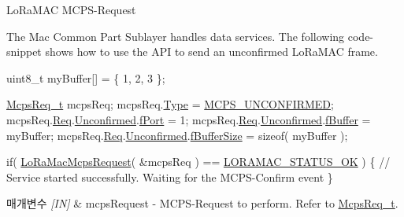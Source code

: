 Lo\+Ra\+M\+AC M\+C\+P\+S-\/\+Request 

The Mac Common Part Sublayer handles data services. The following code-\/snippet shows how to use the A\+PI to send an unconfirmed Lo\+Ra\+M\+AC frame.


\begin{DoxyCode}
uint8\_t myBuffer[] = \{ 1, 2, 3 \};

\mbox{\hyperlink{structs_mcps_req}{McpsReq\_t}} mcpsReq;
mcpsReq.\mbox{\hyperlink{structs_mcps_req_a29993a5d65888bf0f36ec406896bb540}{Type}} = \mbox{\hyperlink{group___l_o_r_a_m_a_c_gga7b080a046606f23fe030d0aa6d2a0e30a340afc087e96410da04d07fb0470f84a}{MCPS\_UNCONFIRMED}};
mcpsReq.\mbox{\hyperlink{structs_mcps_req_ae97f4a2d64d47abdc1715093e4b27373}{Req}}.\mbox{\hyperlink{unions_mcps_req_1_1u_mcps_param_a490d6060b7d5f999539375d160304e9c}{Unconfirmed}}.\mbox{\hyperlink{structs_mcps_req_unconfirmed_a2973de9ac0ab5e876b80362bc4c6a88b}{fPort}} = 1;
mcpsReq.\mbox{\hyperlink{structs_mcps_req_ae97f4a2d64d47abdc1715093e4b27373}{Req}}.\mbox{\hyperlink{unions_mcps_req_1_1u_mcps_param_a490d6060b7d5f999539375d160304e9c}{Unconfirmed}}.\mbox{\hyperlink{structs_mcps_req_unconfirmed_a2e9f11cf5a8f2a797999359bedee31af}{fBuffer}} = myBuffer;
mcpsReq.\mbox{\hyperlink{structs_mcps_req_ae97f4a2d64d47abdc1715093e4b27373}{Req}}.\mbox{\hyperlink{unions_mcps_req_1_1u_mcps_param_a490d6060b7d5f999539375d160304e9c}{Unconfirmed}}.\mbox{\hyperlink{structs_mcps_req_unconfirmed_a6b4fc83528d7391a193516d9f4ba985b}{fBufferSize}} = \textcolor{keyword}{sizeof}( myBuffer );

\textcolor{keywordflow}{if}( \mbox{\hyperlink{group___l_o_r_a_m_a_c_ga79768f8a3c22aaff84d4dfcc77ad508c}{LoRaMacMcpsRequest}}( &mcpsReq ) == \mbox{\hyperlink{group___l_o_r_a_m_a_c_gga1d18f26b344040b3ec5c3db662919661a03db5fca052313edb3823c014b653a74}{LORAMAC\_STATUS\_OK}} )
\{
  \textcolor{comment}{// Service started successfully. Waiting for the MCPS-Confirm event}
\}
\end{DoxyCode}



\begin{DoxyParams}{매개변수}
{\em \mbox{[}\+I\+N\mbox{]}} & mcps\+Request -\/ M\+C\+P\+S-\/\+Request to perform. Refer to \mbox{\hyperlink{group___l_o_r_a_m_a_c_ga038e0fe5eecc1fc4e8165eace8e2e683}{Mcps\+Req\+\_\+t}}.\\
\hline
\end{DoxyParams}

